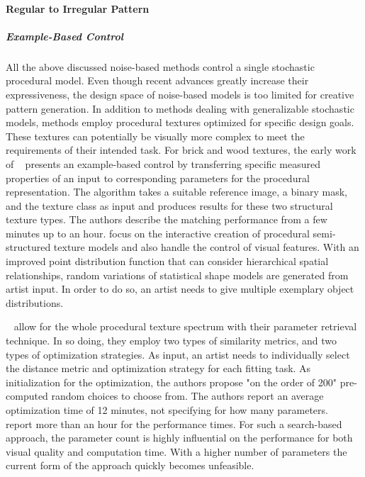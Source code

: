 \paragraph{Regular to Irregular Pattern}
\label{para:analysis_distribution_and_repetition_regular}


\subparagraph{Example-Based Control}
\label{subpara:analysis_regular_examplebased_control}

All the above discussed noise-based methods control a single stochastic procedural model. Even though recent advances greatly increase their expressiveness, the design space of noise-based models is too limited for creative pattern generation. In addition to methods dealing with generalizable stochastic models, methods employ procedural textures optimized for specific design goals. These textures can potentially be visually more complex to meet the requirements of their intended task. For brick and wood textures, the early work of \citeauthor*{lefebvre_2000_ass}~\cite{lefebvre_2000_ass} presents an example-based control by transferring specific measured properties of an input to corresponding parameters for the procedural representation. The algorithm takes a suitable reference image, a binary mask, and the texture class as input and produces results for these two structural texture types. The authors describe the matching performance from a few minutes up to an hour. \cite{gilet_2012_map} focus on the interactive creation of procedural semi-structured texture models and also handle the control of visual features. With an improved point distribution function that can consider hierarchical spatial relationships, random variations of statistical shape models are generated from artist input. In order to do so, an artist needs to give multiple exemplary object distributions. 

\citeauthor*{bourque_2004_ptm}~\cite{bourque_2004_ptm} allow for the whole procedural texture spectrum with their parameter retrieval technique. In so doing, they employ two types of similarity metrics, and two types of optimization strategies. As input, an artist needs to individually select the distance metric and optimization strategy for each fitting task. As initialization for the optimization, the authors propose "on the order of 200" pre-computed random choices to choose from. The authors report an average optimization time of 12 minutes, not specifying for how many parameters. \citeauthor*{gilet_2012_mkn}~\cite{gilet_2012_mkn} report more than an hour for the performance times. For such a search-based approach, the parameter count is highly influential on the performance for both visual quality and computation time. With a higher number of parameters the current form of the approach quickly becomes unfeasible. 

